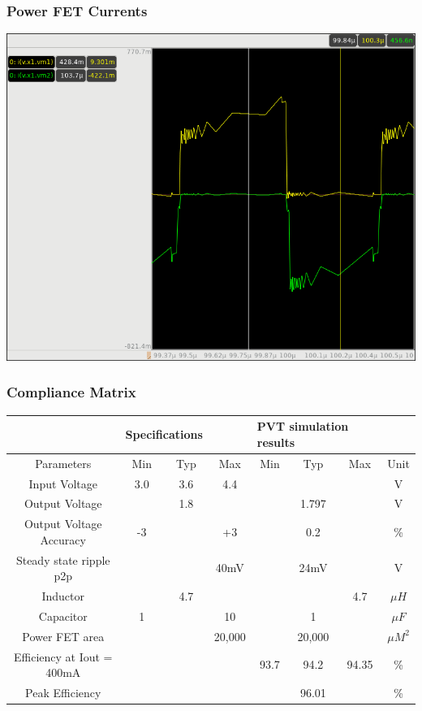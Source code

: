 \documentclass{beamer}
\begin{document}
\begin{frame}
  \frametitle{Power FET Currents}
  \includegraphics[scale=0.25]{hiside-lowside-current.png}
\end{frame}

\begin{frame}
  \frametitle{Compliance Matrix}
  \begin{center}
    {\scriptsize
      \begin{tabular}{| c | c | c | c | c  | c | c | c |}
        \hline      
         & \multicolumn{2}{l}{Specifications} & & \multicolumn{3}{l}{PVT
simulation results} &\\
        \hline
        Parameters & Min & Typ & Max & Min & Typ & Max & Unit \\
        \hline
        Input Voltage & 3.0 & 3.6 & 4.4 & & & & V \\
        Output Voltage & & 1.8 &  & & 1.797 & & V \\
        Output Voltage Accuracy & -3 & & +3 & & 0.2 & & \% \\
        Steady state ripple p2p &  & & 40mV & & 24mV & & V \\
        Inductor & & 4.7 & & & & 4.7 & $\mu H$ \\
        Capacitor & 1 &  & 10 & & 1 & & $\mu F$ \\
        Power FET area & & & 20,000 & & 20,000 & & $\mu M^2$ \\
        Efficiency at Iout = 400mA & & & & 93.7 & 94.2 & 94.35 & \% \\
        Peak Efficiency & & & &  & 96.01 & & \% \\      
        \hline
      \end{tabular}
    }
  \end{center}

\end{frame}
\end{document}
